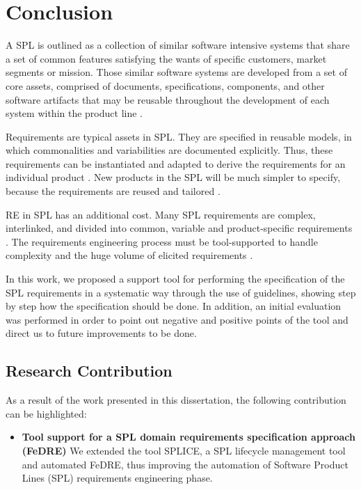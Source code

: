 \chapter{Conclusion}
\label{ch:conclusion}

A \acf{SPL} is outlined as a collection of similar software intensive systems
that share a set of common features satisfying the wants of specific customers, market segments 
or mission. Those similar software systems are developed from a set of core assets, comprised of 
documents, specifications, components, and other software artifacts that may be reusable throughout 
the development of each system within the product line \citep{rafael2013systems}.

Requirements are typical assets in \ac{SPL}. They are specified in reusable models,
in which commonalities and variabilities are documented explicitly. Thus, these 
requirements can be instantiated and adapted to derive the requirements for an 
individual product \citep{cheng2007research}. New products in the SPL will be
much simpler to specify, because the requirements are reused and tailored
\citep{clements2002software}.

\acf{RE} in \ac{SPL} has an additional cost. Many \ac{SPL} requirements are
complex, interlinked, and divided into common, variable and product-specific requirements 
\citep{birk2003report,de2014defining}.  The requirements engineering process
must be tool-supported to handle complexity and the huge volume of elicited requirements
\citep{birk2003report}.

In this work, we proposed a support tool for performing the
specification of the \ac{SPL} requirements in a systematic way through the use of guidelines,  
showing step by step how the specification should be done. In addition, an
initial evaluation was performed in order to point out negative and positive
points of the tool and direct us to future improvements to be done.

\section{Research Contribution}
\label{sc:reserach-contrib}
As a result of the work presented in this dissertation, the following contribution can be highlighted:
\begin{itemize}
\item \textbf{Tool support for a SPL domain requirements specification approach
(FeDRE)} 
We extended the tool \ac{SPLICE}, a \ac{SPL} lifecycle management tool
and automated \acf{FeDRE}, thus improving the automation of Software Product Lines (\ac{SPL}) 
requirements engineering phase.
\end{itemize}

